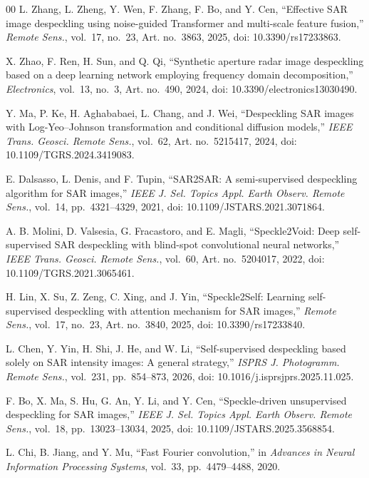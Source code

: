 \documentclass[journal]{IEEEtran}
\begin{document}
\begin{thebibliography}{00}
L. Zhang, L. Zheng, Y. Wen, F. Zhang, F. Bo, and Y. Cen, ``Effective SAR image despeckling using noise-guided Transformer and multi-scale feature fusion,'' \emph{Remote Sens.}, vol.~17, no.~23, Art. no.~3863, 2025, doi: 10.3390/rs17233863.

X. Zhao, F. Ren, H. Sun, and Q. Qi, ``Synthetic aperture radar image despeckling based on a deep learning network employing frequency domain decomposition,'' \emph{Electronics}, vol.~13, no.~3, Art. no.~490, 2024, doi: 10.3390/electronics13030490.

Y. Ma, P. Ke, H. Aghababaei, L. Chang, and J. Wei, ``Despeckling SAR images with Log-Yeo--Johnson transformation and conditional diffusion models,'' \emph{IEEE Trans. Geosci. Remote Sens.}, vol.~62, Art. no.~5215417, 2024, doi: 10.1109/TGRS.2024.3419083.

E. Dalsasso, L. Denis, and F. Tupin, ``SAR2SAR: A semi-supervised despeckling algorithm for SAR images,'' \emph{IEEE J. Sel. Topics Appl. Earth Observ. Remote Sens.}, vol.~14, pp.~4321--4329, 2021, doi: 10.1109/JSTARS.2021.3071864.

A. B. Molini, D. Valsesia, G. Fracastoro, and E. Magli, ``Speckle2Void: Deep self-supervised SAR despeckling with blind-spot convolutional neural networks,'' \emph{IEEE Trans. Geosci. Remote Sens.}, vol.~60, Art. no.~5204017, 2022, doi: 10.1109/TGRS.2021.3065461.

H. Lin, X. Su, Z. Zeng, C. Xing, and J. Yin, ``Speckle2Self: Learning self-supervised despeckling with attention mechanism for SAR images,'' \emph{Remote Sens.}, vol.~17, no.~23, Art. no.~3840, 2025, doi: 10.3390/rs17233840.

L. Chen, Y. Yin, H. Shi, J. He, and W. Li, ``Self-supervised despeckling based solely on SAR intensity images: A general strategy,'' \emph{ISPRS J. Photogramm. Remote Sens.}, vol.~231, pp.~854--873, 2026, doi: 10.1016/j.isprsjprs.2025.11.025.

F. Bo, X. Ma, S. Hu, G. An, Y. Li, and Y. Cen, ``Speckle-driven unsupervised despeckling for SAR images,'' \emph{IEEE J. Sel. Topics Appl. Earth Observ. Remote Sens.}, vol.~18, pp.~13023--13034, 2025, doi: 10.1109/JSTARS.2025.3568854.

L. Chi, B. Jiang, and Y. Mu, ``Fast Fourier convolution,'' in \emph{Advances in Neural Information Processing Systems}, vol.~33, pp.~4479--4488, 2020.


\end{thebibliography}
\end{document}
